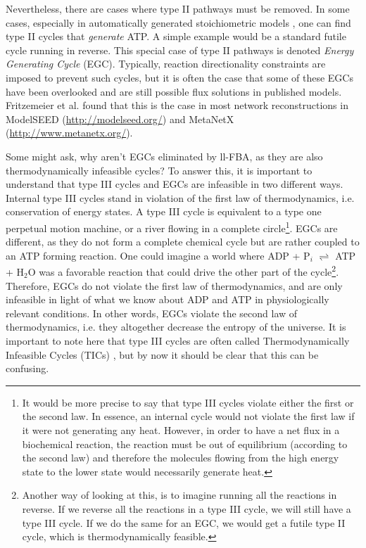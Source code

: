 \documentclass[twocolumn]{article}
\begin{document}
Nevertheless, there are cases where type II pathways must be removed. In some cases, especially in automatically generated stoichiometric models \cite{Fritzemeier2017-ba}, one can find type II cycles that \textit{generate} ATP. A simple example would be a standard futile cycle running in reverse. This special case of type II pathways is denoted \textit{Energy Generating Cycle} (EGC). Typically, reaction directionality constraints are imposed to prevent such cycles, but it is often the case that some of these EGCs have been overlooked and are still possible flux solutions in published models. Fritzemeier et al. \cite{Fritzemeier2017-ba} found that this is the case in most network reconstructions in ModelSEED (\url{http://modelseed.org/}) and MetaNetX (\url{http://www.metanetx.org/}). 

Some might ask, why aren't EGCs eliminated by ll-FBA, as they are also thermodynamically infeasible cycles? To answer this, it is important to understand that type III cycles and EGCs are infeasible in two different ways. Internal type III cycles stand in violation of the first law of thermodynamics, i.e. conservation of energy states. A type III cycle is equivalent to a type one perpetual motion machine, or a river flowing in a complete circle\footnote{It would be more precise to say that type III cycles violate either the first or the second law. In essence, an internal cycle would not violate the first law if it were not generating any heat. However, in order to have a net flux in a biochemical reaction, the reaction must be out of equilibrium (according to the second law) and therefore the molecules flowing from the high energy state to the lower state would necessarily generate heat.}. EGCs are different, as they do not form a complete chemical cycle but are rather coupled to an ATP forming reaction. One could imagine a world where ADP + P$_i$ $\rightleftharpoons$ ATP + H$_2$O was a favorable reaction that could drive the other part of the cycle\footnote{Another way of looking at this, is to imagine running all the reactions in reverse. If we reverse all the reactions in a type III cycle, we will still have a type III cycle. If we do the same for an EGC, we would get a futile type II cycle, which is thermodynamically feasible.}. Therefore, EGCs do not violate the first law of thermodynamics, and are only infeasible in light of what we know about ADP and ATP in physiologically relevant conditions. In other words, EGCs violate the second law of thermodynamics, i.e. they altogether decrease the entropy of the universe. It is important to note here that type III cycles are often called Thermodynamically Infeasible Cycles (TICs) \cite{DeMartino2013, Desouki2015-lh}, but by now it should be clear that this can be confusing.
\end{document}
